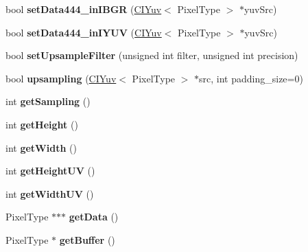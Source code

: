 \begin{DoxyCompactItemize}
bool {\bfseries set\+Data444\+\_\+in\+I\+B\+GR} (\hyperlink{class_c_i_yuv}{C\+I\+Yuv}$<$ Pixel\+Type $>$ $\ast$yuv\+Src)
\item 
\mbox{\label{class_c_i_yuv_addad59f3e12140575bb2c6ec31303cf2}} 
bool {\bfseries set\+Data444\+\_\+in\+I\+Y\+UV} (\hyperlink{class_c_i_yuv}{C\+I\+Yuv}$<$ Pixel\+Type $>$ $\ast$yuv\+Src)
\item 
\mbox{\label{class_c_i_yuv_a3fb870648a697de433f44b2c7fd400b5}} 
bool {\bfseries set\+Upsample\+Filter} (unsigned int filter, unsigned int precision)
\item 
\mbox{\label{class_c_i_yuv_a77e31210406a5f2b6d61be46b882c84c}} 
bool {\bfseries upsampling} (\hyperlink{class_c_i_yuv}{C\+I\+Yuv}$<$ Pixel\+Type $>$ $\ast$src, int padding\+\_\+size=0)
\item 
\mbox{\label{class_c_i_yuv_a133e94a333e4a7b4ad918fdbbe1aef1c}} 
int {\bfseries get\+Sampling} ()
\item 
\mbox{\label{class_c_i_yuv_a4ae063446164d691506face2e8b329c0}} 
int {\bfseries get\+Height} ()
\item 
\mbox{\label{class_c_i_yuv_a8439f34dc19ba36242a3d4639f63d4fd}} 
int {\bfseries get\+Width} ()
\item 
\mbox{\label{class_c_i_yuv_a6cc14d101b658d8a91f37aa082dc7223}} 
int {\bfseries get\+Height\+UV} ()
\item 
\mbox{\label{class_c_i_yuv_a5a60d0cb8555ae548c2e146e23636697}} 
int {\bfseries get\+Width\+UV} ()
\item 
\mbox{\label{class_c_i_yuv_a0dbaec58c5d90734536116a90999dcde}} 
Pixel\+Type $\ast$$\ast$$\ast$ {\bfseries get\+Data} ()
\item 
\mbox{\label{class_c_i_yuv_a1a7a1b1f2c8817c647b223933993d39e}} 
Pixel\+Type $\ast$ {\bfseries get\+Buffer} ()
\end{DoxyCompactItemize}
